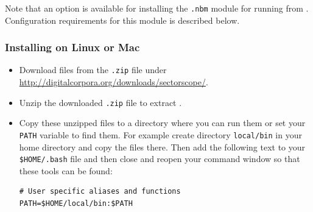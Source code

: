 \documentclass[11pt,fleqn]{article} %
\begin{document}
Note that an option is available for installing the \sscope \aut \verb+.nbm+ module for running \sscope from \aut.  Configuration requirements for this module is described below.

\subsubsection{Installing on Linux or Mac}
\begin{itemize}
\item Download \sscope files from the \verb+.zip+ file under \url{http://digitalcorpora.org/downloads/sectorscope/}.\\
\item Unzip  the downloaded \verb+.zip+ file to extract \sscope.
\item Copy these unzipped files to a directory where you can run them or set your \verb+PATH+ variable to find them. For example create directory \verb+local/bin+ in your home directory and copy the files there. Then add the following text to your \verb+$HOME/.bash+ file and then close and reopen your command window so that these tools can be found:

\begingroup
\footnotesize
\begin{Verbatim}[fontfamily=courier]
# User specific aliases and functions
PATH=$HOME/local/bin:$PATH
\end{Verbatim}
\endgroup
\end{itemize}
\end{document}
